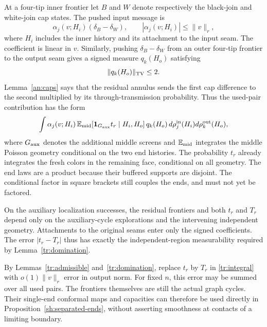 At a four-tip inner frontier let $B$ and $W$ denote respectively the
black-join and white-join cap states.  The pushed input message is
\begin{equation}
                 \alpha_j(v;H_i)(\delta_B-\delta_W),
                 \qquad |\alpha_j(v;H_i)|\le\|v\|_r,
\label{tr:inner-coefficient}
\end{equation}
where $H_i$ includes the inner history and its attachment to the input
seam.  The coefficient is linear in $v$.  Similarly, pushing
$\delta_B-\delta_W$ from an outer four-tip frontier to the output seam
gives a signed measure $q_k(H_o)$ satisfying
\begin{equation}
                         \|q_k(H_o)\|_{\mathrm{TV}}\le2.
\label{tr:outer-coefficient}
\end{equation}
Lemma~\ref{an:caps} says that the residual annulus sends the first
cap difference to the second multiplied by its through-transmission
probability.  Thus the used-pair contribution has the form
\begin{equation}
 \int \alpha_j(v;H_i)\,
       \mathbb E_{\rm mid}\!\left[
          \boldsymbol1_{G_{\rm aux}}t_r\mid H_i,H_o\right]
       q_k(H_o)\,d\rho_j^{\rm in}(H_i)d\rho_k^{\rm out}(H_o),
\label{tr:integral}
\end{equation}
where $G_{\rm aux}$ denotes the additional middle screens and
$\mathbb E_{\rm mid}$ integrates the middle Poisson geometry conditional on
the two end histories.  The probability $t_r$ already integrates the
fresh colors in the remaining face, conditional on all geometry.
The end laws are a product because their buffered supports are
disjoint.  The conditional factor in square brackets still couples
the ends, and must not yet be factored.

On the auxiliary localization successes, the residual frontiers and
both $t_r$ and $T_r$ depend only on the auxiliary-cycle explorations and
the intervening independent geometry.  Attachments to the original
seams enter only the signed coefficients.  The error $|t_r-T_r|$ thus
has exactly the independent-region measurability required by
Lemma~\ref{tr:domination}.

By Lemmas~\ref{tr:admissible} and~\ref{tr:domination}, replace $t_r$ by
$T_r$ in \eqref{tr:integral} with $o(1)\|v\|_r$ error in output norm.
For fixed $n$, this error may be summed over all used pairs.  The
frontiers themselves are still the actual graph cycles.  Their
single-end conformal maps and capacities can therefore be used
directly in Proposition~\ref{sh:separated-ends}, without asserting
smoothness at contacts of a limiting boundary.

